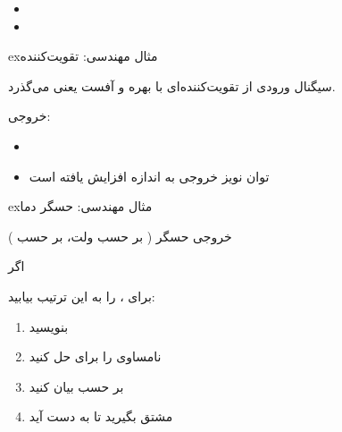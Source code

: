 \begin{itemize}
\tightlist
\item
\item
\end{itemize}

\begin{PSbox}[unbreakable]{ex}{مثال مهندسی: تقویت‌کننده}

سیگنال ورودی  از تقویت‌کننده‌ای با بهره  و آفست  یعنی  می‌گذرد.

خروجی: 

\begin{itemize}
\tightlist
\item
\item
  توان نویز خروجی به اندازه  افزایش یافته است
\end{itemize}

\end{PSbox}

\begin{PSbox}[unbreakable]{ex}{مثال مهندسی: حسگر دما}

خروجی حسگر  ( بر حسب ولت،  بر حسب )

اگر 

\end{PSbox}



برای ،  را به این ترتیب بیابید:

\begin{enumerate}
\def\labelenumi{\arabic{enumi}.}
\tightlist
\item
  بنویسید 
\item
  نامساوی را برای  حل کنید
\item
  بر حسب  بیان کنید
\item
  مشتق بگیرید تا  به دست آید
\end{enumerate}

